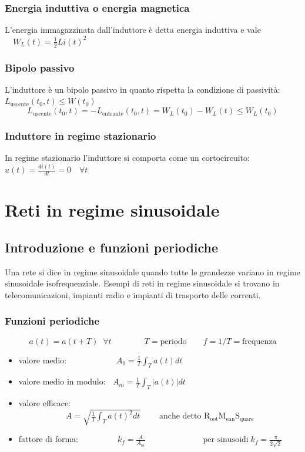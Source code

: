 \documentclass[a4paper]{article}
\begin{document}
\subsubsection*{Energia induttiva o energia magnetica}
L'energia immagazzinata dall'induttore è detta energia induttiva e vale \(\quad\displaystyle W_L(t) = \frac{1}{2} L i(t)^2\)

\subsubsection*{Bipolo passivo}
L'induttore è un bipolo passivo in quanto rispetta la condizione di passività: \(L_\text{uscente}(t_0,t) \leq W(t_0)\)
\[L_\text{uscente}(t_0,t) = -L_\text{entrante}(t_0,t) = W_L(t_0)-W_L(t) \leq W_L(t_0)\]

\subsubsection*{Induttore in regime stazionario}
In regime stazionario l'induttore si comporta come un cortocircuito: \(\displaystyle u(t) = \frac{d i(t)}{dt} = 0 \quad \forall t\)

\newpage


\section{Reti in regime sinusoidale}
\subsection{Introduzione e funzioni periodiche}
Una rete si dice in regime sinusoidale quando tutte le grandezze variano in regime sinusoidale isofrequenziale. Esempi di reti in
regime sinusoidale si trovano in telecomunicazioni, impianti radio e impianti di trasporto delle correnti.

\subsubsection*{Funzioni periodiche}
\[a(t) = a(t + T) \;\; \forall t \qquad\qquad T = \text{periodo} \qquad f = 1/T = \text{frequenza}\]
\begin{itemize}
	\item valore medio: \(\displaystyle \qquad\qquad\quad\;\;\, A_0 = \frac{1}{T} \int_T a(t) dt\)
	\item valore medio in modulo: \(\displaystyle\;\; A_m = \frac{1}{T} \int_T \left|a(t)\right| dt\)
	\item valore efficace: \(\displaystyle \qquad\qquad\quad\;\;\, A = \sqrt{\frac{1}{T} \int_T a(t)^2 dt} \qquad\; \text{anche detto R}_\text{oot} \text{M}_\text{ean} \text{S}_\text{quare}\)
	\item fattore di forma: \(\displaystyle \qquad\qquad\;\, k_f = \frac{A}{A_m} \qquad\qquad\qquad\quad \text{per sinusoidi} \; k_f = \frac{\pi}{2\sqrt{2}}\)
\end{itemize}
\end{document}
